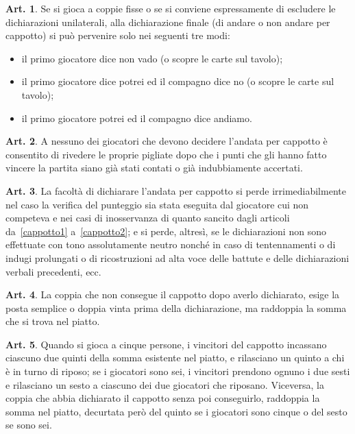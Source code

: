 \documentclass[italian,a4paper]{book}
\theoremstyle{definition}
\newtheorem{art}{Art.}
\newenvironment{packeditem}{
\begin{itemize}
  \setlength{\itemsep}{1pt}
  \setlength{\parskip}{0pt}
  \setlength{\parsep}{0pt}
}{\end{itemize}}
\begin{document}
\begin{art}
Se si gioca a coppie fisse o se si conviene espressamente di escludere le dichiarazioni unilaterali, alla dichiarazione finale  (di andare o non andare per cappotto) si può pervenire solo nei seguenti tre modi:
\begin{packeditem}
\item    il primo giocatore dice non vado (o scopre le carte sul tavolo);
\item    il primo giocatore dice potrei ed il compagno dice no  (o scopre le carte sul tavolo);
\item    il primo giocatore potrei ed il compagno dice andiamo.
    \end{packeditem}
\end{art}
\begin{art}
A nessuno dei giocatori che devono decidere l'andata per cappotto è consentito di rivedere le proprie pigliate dopo che i punti che gli hanno fatto vincere la partita siano già stati contati o già indubbiamente accertati.
\end{art}
\begin{art}
La facoltà di dichiarare l'andata per cappotto si perde irrimediabilmente
nel caso la verifica del punteggio sia stata eseguita dal giocatore cui non
competeva e nei casi di inosservanza di quanto sancito dagli articoli
da~\ref{cappotto1}
a~\ref{cappotto2};  e si perde, altresì, se le dichiarazioni non sono effettuate con tono assolutamente neutro nonché in caso di tentennamenti o di indugi prolungati o di  ricostruzioni ad alta voce delle battute e delle dichiarazioni verbali precedenti, ecc.
\end{art}
\begin{art}
La coppia che non consegue il cappotto dopo averlo dichiarato, esige la posta semplice o doppia vinta prima della dichiarazione, ma raddoppia la somma che si trova nel piatto.
\end{art}
\begin{art}
Quando si gioca a cinque persone, i vincitori del cappotto incassano ciascuno due quinti della somma esistente nel piatto, e rilasciano un quinto a chi è in turno di riposo; se i giocatori sono sei, i vincitori prendono ognuno i due sesti e rilasciano un sesto a ciascuno dei due giocatori che riposano. Viceversa, la coppia che abbia dichiarato il cappotto senza poi conseguirlo, raddoppia la somma nel piatto, decurtata però del quinto se i giocatori sono cinque o del sesto se sono sei.
\end{art}
\end{document}
